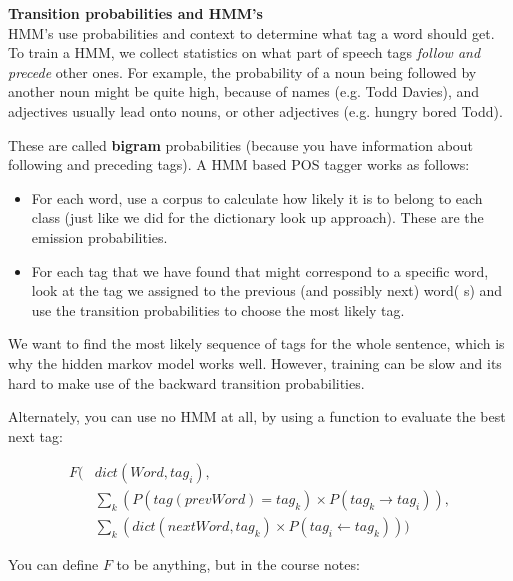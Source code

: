 \begin{description}

  \item \textbf{Transition probabilities and HMM's}\\

  HMM's use probabilities and context to determine what tag a word should get.
  To train a HMM, we collect statistics on what part of speech tags
  \textit{follow and precede} other ones. For example, the probability of a noun
  being followed by another noun might be quite high, because of names (e.g.
  Todd Davies), and adjectives usually lead onto nouns, or other adjectives
  (e.g. hungry bored Todd).

  These are called \textbf{bigram} probabilities (because you have information
  about following and preceding tags). A HMM based POS tagger works as follows:

  \begin{itemize}
    \item For each word, use a corpus to calculate how likely it is to belong 
    to each class (just like we did for the dictionary look up approach). These 
    are the emission probabilities.
    \item For each tag that we have found that might correspond to a specific 
    word, look at the tag we assigned to the previous (and possibly next) word(
    s) and use the transition probabilities to choose the most likely tag.
  \end{itemize}

  We want to find the most likely sequence of tags for the whole sentence, which
  is why the hidden markov model works well. However, training can be slow and
  its hard to make use of the backward transition probabilities.


  Alternately, you can use no HMM at all, by using a function to evaluate the
  best next tag:

  \[
    \begin{split}
    F(&dict(Word, tag_i),\\
      &\sum_k(P(tag(prevWord) = tag_k) \times P(tag_k \rightarrow tag_i)),\\
      &\sum_k(dict(nextWord, tag_k) \times P(tag_i \leftarrow tag_k)))
    \end{split}
  \]

  You can define $F$ to be anything, but in the course notes:


\end{description}
